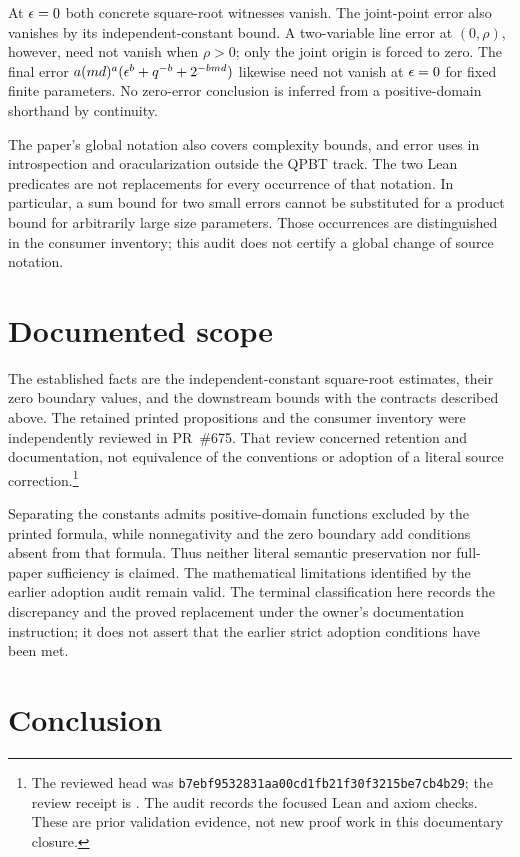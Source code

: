 \documentclass[11pt]{article}
\begin{document}
At $\epsilon=0$ both concrete square-root witnesses vanish. The joint-point
error also vanishes by its independent-constant bound. A two-variable line
error at $(0,\rho)$, however, need not vanish when $\rho>0$; only the joint
origin is forced to zero. The final error
$a(md)^a(\epsilon^b+q^{-b}+2^{-bmd})$ likewise need not vanish at $\epsilon=0$ for
fixed finite parameters. No zero-error conclusion is inferred from a
positive-domain shorthand by continuity.

The paper's global notation also covers complexity bounds, and error
uses in introspection and oracularization outside the QPBT track. The two
Lean predicates are not replacements for every occurrence of that notation.
In particular, a sum bound for two small errors cannot be substituted for a
product bound for arbitrarily large size parameters. Those occurrences are
distinguished in the consumer inventory; this audit does not certify a
global change of source notation.

\section{Documented scope}

The established facts are the independent-constant square-root estimates,
their zero boundary values, and the downstream bounds with the contracts
described above. The retained printed propositions and the consumer
inventory were independently reviewed in PR~\#675. That review concerned
retention and documentation, not equivalence of the conventions or adoption
of a literal source correction.\footnote{The reviewed head was
\texttt{b7ebf9532831aa00cd1fb21f30f3215be7cb4b29}; the review receipt is
.
The audit records the focused Lean and axiom checks. These are prior
validation evidence, not new proof work in this documentary closure.}

Separating the constants admits positive-domain functions excluded by the
printed formula, while nonnegativity and the zero boundary add conditions
absent from that formula. Thus neither literal semantic preservation nor
full-paper sufficiency is claimed. The mathematical limitations identified
by the earlier adoption audit remain valid. The terminal classification
here records the discrepancy and the proved replacement under the owner's
documentation instruction; it does not assert that the earlier strict
adoption conditions have been met.

\section{Conclusion}
\end{document}
